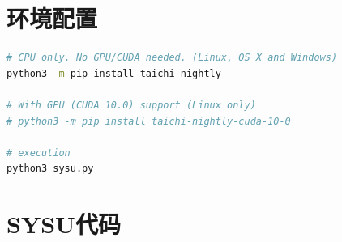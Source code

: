 \documentclass[thesis]{thesis}
\begin{document}



\newpage
\appendix
\appendixconfig
\section{环境配置}
\label{appendix:env}
\begin{lstlisting}[language=bash]
# CPU only. No GPU/CUDA needed. (Linux, OS X and Windows)
python3 -m pip install taichi-nightly

# With GPU (CUDA 10.0) support (Linux only)
# python3 -m pip install taichi-nightly-cuda-10-0

# execution
python3 sysu.py
\end{lstlisting}

\section{SYSU代码}
\label{appendix:sysu}
\end{document}
